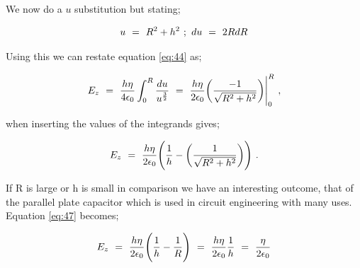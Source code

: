 \documentclass{article}
\begin{document}
We now do a \begin{math} u \end{math} substitution but stating;

\begin{equation} \label{eq:45}
u \hspace{0.125cm} = \hspace{0.125cm} R^2 + h^2 \hspace{0.125cm} ; \hspace{0.125cm} du \hspace{0.125cm}  = \hspace{0.125cm}  2R dR
\end{equation}

Using this we can restate equation \ref{eq:44} as;

\begin{equation} \label{eq:46}
E_{z} \hspace{0.125cm} = \hspace{0.125cm} \frac{h \eta }{4 \epsilon_{0}} \int_{0}^{R} \frac{du}{u^{\frac{3}{2}}} \hspace{0.125cm} = \hspace{0.125cm} \frac{h \eta }{2 \epsilon_{0}} \bigg( \frac{-1}{\sqrt{R^2 + h^2}} \bigg) \Bigg|_{0}^{R} \hspace{0.125cm} ,
\end{equation}

when inserting the values of the integrands gives;

\begin{equation} \label{eq:47}
E_{z} \hspace{0.125cm} = \hspace{0.125cm} \frac{h \eta }{2 \epsilon_{0}} \Bigg( \frac{1}{h} - \bigg( \frac{1}{\sqrt{R^2 + h^2}} \bigg) \Bigg) \hspace{0.125cm} .
\end{equation}

If R is large or h is small in comparison we have an interesting outcome, that of the parallel plate capacitor which is used in circuit engineering with many uses. Equation \ref{eq:47} becomes;

\begin{equation} \label{eq:48}
E_{z} \hspace{0.125cm} = \hspace{0.125cm} \frac{h \eta }{2 \epsilon_{0}} \Bigg( \frac{1}{h} - \frac{1}{R} \Bigg) \hspace{0.125cm} = \hspace{0.125cm} \frac{h \eta }{2 \epsilon_{0}} \frac{1}{h} \hspace{0.125cm} = \hspace{0.125cm} \frac{\eta }{2 \epsilon_{0}}
\end{equation}
\end{document}
